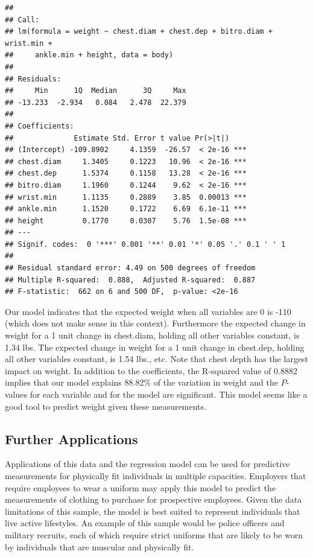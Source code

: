 \documentclass[11pt]{article}\usepackage[]{graphicx}\usepackage[]{color}
\makeatletter
\newenvironment{kframe}{%
 \def\at@end@of@kframe{}%
 \ifinner\ifhmode%
  \def\at@end@of@kframe{\end{minipage}}%
  \begin{minipage}{\columnwidth}%
 \fi\fi%
 \def\FrameCommand##1{\hskip\@totalleftmargin \hskip-\fboxsep
 \colorbox{shadecolor}{##1}\hskip-\fboxsep
     \hskip-\linewidth \hskip-\@totalleftmargin \hskip\columnwidth}%
 \MakeFramed {\advance\hsize-\width
   \@totalleftmargin\z@ \linewidth\hsize
   \@setminipage}}%
 {\par\unskip\endMakeFramed%
 \at@end@of@kframe}
\newenvironment{knitrout}{}{} %
\makeatother
\begin{document}
\begin{knitrout}
\color{fgcolor}\begin{kframe}
\begin{verbatim}
## 
## Call:
## lm(formula = weight ~ chest.diam + chest.dep + bitro.diam + wrist.min + 
##     ankle.min + height, data = body)
## 
## Residuals:
##     Min      1Q  Median      3Q     Max 
## -13.233  -2.934   0.084   2.478  22.379 
## 
## Coefficients:
##              Estimate Std. Error t value Pr(>|t|)    
## (Intercept) -109.8902     4.1359  -26.57  < 2e-16 ***
## chest.diam     1.3405     0.1223   10.96  < 2e-16 ***
## chest.dep      1.5374     0.1158   13.28  < 2e-16 ***
## bitro.diam     1.1960     0.1244    9.62  < 2e-16 ***
## wrist.min      1.1135     0.2889    3.85  0.00013 ***
## ankle.min      1.1520     0.1722    6.69  6.1e-11 ***
## height         0.1770     0.0307    5.76  1.5e-08 ***
## ---
## Signif. codes:  0 '***' 0.001 '**' 0.01 '*' 0.05 '.' 0.1 ' ' 1
## 
## Residual standard error: 4.49 on 500 degrees of freedom
## Multiple R-squared:  0.888,	Adjusted R-squared:  0.887 
## F-statistic:  662 on 6 and 500 DF,  p-value: <2e-16
\end{verbatim}
\end{kframe}
\end{knitrout}


Our model indicates that the expected weight when all variables are 0 is -110 (which does not make sense in this context). Furthermore the expected change in weight for a 1 unit change in chest.diam, holding all other variables constant, is 1.34 lbs. The expected change in weight for a 1 unit change in chest.dep, holding all other variables constant, is 1.54 lbs., etc. Note that chest depth has the largest impact on weight. In addition to the coefficients, the R-squared value of 0.8882 implies that our model explains 88.82\% of the variation in weight and the $P$-values for each variable and for the model are significant. This model seems like a good tool to predict weight given these measurements.


\subsection{Further Applications} %

Applications of this data and the regression model can be used for predictive measurements for physically fit individuals in multiple capacities.  Employers that require employees to wear a uniform may apply this model to predict the measurements of clothing to purchase for prospective employees.  Given the data limitations of this sample, the model is best suited to represent individuals that live active lifestyles.  An example of this sample would be police officers and military recruits, each of which require strict uniforms that are likely to be worn by individuals that are muscular and physically fit. \\
\end{document}
